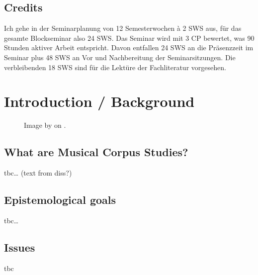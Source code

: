 \documentclass[letterpaper,10pt,english]{sphinxmanual}
\begin{document}
\section{Credits}
\label{\detokenize{orga:credits}}
Ich gehe in der Seminarplanung von 12 Semesterwochen à 2 SWS aus, für das gesamte Blockseminar also 24 SWS.
Das Seminar wird mit 3 CP bewertet, was 90 Stunden aktiver Arbeit entspricht.
Davon entfallen 24 SWS an die Präsenzzeit im Seminar plus 48 SWS an Vor\sphinxhyphen{} und Nachbereitung der Seminarsitzungen.
Die verbleibenden 18 SWS sind für die Lektüre der Fachliteratur vorgesehen.


\chapter{Introduction / Background}
\label{\detokenize{background:introduction-background}}\label{\detokenize{background::doc}}
\begin{figure}[htbp]
\centering
\capstart

\noindent{}
\caption{Image by 
on .}\label{\detokenize{background:id9}}\end{figure}


\section{What are Musical Corpus Studies?}
\label{\detokenize{background:what-are-musical-corpus-studies}}
tbc… (text from diss?)


\section{Epistemological goals}
\label{\detokenize{background:epistemological-goals}}
tbc…


\section{Issues}
\label{\detokenize{background:issues}}
tbc 
\end{document}

